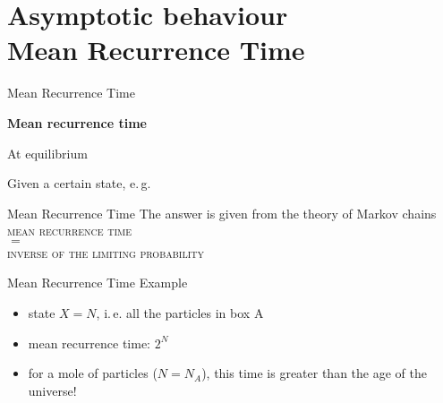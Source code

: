 \documentclass[usenames,dvipsnames]{beamer}
\begin{document}
  \section{Asymptotic behaviour\\\small{Mean Recurrence Time}}
  \begin{frame}{Mean Recurrence Time}
    \begin{center}
      \Large \textbf{Mean recurrence time}
    \end{center}
    \alert<3>{At equilibrium}

    Given a certain state, e.\,g.

    \begin{figure}
      
    \end{figure}


    \begin{figure}
    \end{figure}
    
  \end{frame}

  \begin{frame}{Mean Recurrence Time}
    \centering
    The answer is given from the theory of Markov chains\\
    \vspace{20pt}
    \Large
    \alert{\textsc{mean recurrence time}}\\ \alert{$=$} \\
    \alert{\textsc{inverse of the limiting probability}}
  \end{frame}

  \begin{frame}{Mean Recurrence Time}
    Example
    \begin{itemize}
      \item state $X = N$, i.\,e. all the particles in box A
    \end{itemize}

    \begin{figure}
      
    \end{figure}

    \begin{itemize}
      \item mean recurrence time: \alert{$2^N$}
      \item for a mole of particles ($N = N_A$), this time is greater than the age of the universe!
    \end{itemize}
  \end{frame}
\end{document}
